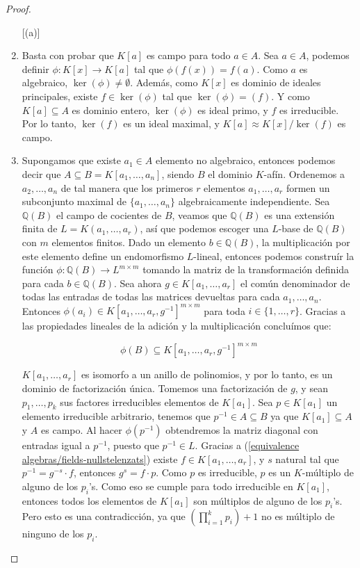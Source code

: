 \begin{proof}
\begin{enumerate} [(a)]
\item Basta con probar que $K[a]$ es campo para todo $a \in A$. Sea $a \in A$, podemos definir $\phi:K[x] \rightarrow K[a]$ tal que $\phi(f(x)) = f(a)$. Como $a$ es algebraico, $\ker(\phi) \neq \emptyset$. Además, como $K[x]$ es dominio de ideales principales, existe $f \in \ker(\phi)$ tal que $\ker(\phi) = (f)$. Y como $K[a] \subseteq A$ es dominio entero, $\ker(\phi)$ es ideal primo, y $f$ es irreducible. Por lo tanto, $\ker(f)$ es un ideal maximal, y $K[a] \approx K[x]/\ker(f)$ es campo.
\item Supongamos que existe $a_1 \in A$ elemento no algebraico, entonces podemos decir que $A \subseteq B =K[a_1, \dots, a_n]$, siendo $B$ el dominio $K$-afín. Ordenemos a  $a_2,\dots, a_n$ de tal manera que los primeros $r$ elementos $a_1,\dots,a_r$ formen un subconjunto maximal de $\{a_1,\dots,a_n\}$ algebraicamente independiente. Sea $\mathbb{Q}(B)$ el campo de cocientes de $B$, veamos que $\mathbb{Q}(B)$ es una extensión finita de $L = K(a_1, \dots, a_r)$, así que podemos escoger una $L$-base de $\mathbb{Q}(B)$ con $m$ elementos finitos. Dado un elemento $b \in \mathbb{Q}(B)$, la multiplicación por este elemento define un endomorfismo $L$-lineal, entonces podemos construír la función $\phi: \mathbb{Q}(B) \rightarrow L^{m\times m}$ tomando la matriz de la transformación definida para cada $b \in \mathbb{Q}(B)$. Sea ahora $g \in K[a_1,\dots,a_r]$ el común denominador de todas las entradas de todas las matrices devueltas para cada $a_1,\dots,a_n$. Entonces $\phi(a_i) \in K[a_1,\dots,a_r,g^{-1}]^{m\times m}$ para toda $i \in \{1, \dots, r\}$. Gracias a las propiedades lineales de la adición y la multiplicación concluímos que:

\begin{equation}\label{equivalence algebras/fields-nullstelenzats}
\phi(B) \subseteq K[a_1,\dots,a_r,g^{-1}]^{m\times m}
\end{equation} 

$K[a_1,\dots,a_r]$ es isomorfo a un anillo de polinomios, y por lo tanto, es un dominio de factorización única. Tomemos una factorización de $g$, y sean $p_1,\dots,p_k$ sus factores irreducibles elementos de $K[a_1]$. Sea $p \in K[a_1]$ un elemento irreducible arbitrario, tenemos que $p^{-1} \in A \subseteq B$ ya que $K[a_1] \subseteq A$ y $A$ es campo. Al hacer $\phi(p^{-1})$ obtendremos la matriz diagonal con entradas igual a $p^{-1}$, puesto que $p^{-1} \in L$. Gracias a (\ref{equivalence algebras/fields-nullstelenzats}) existe $f \in K[a_1,\dots, a_r]$, y $s$ natural tal que $p^{-1} = g^{-s}\cdot f$, entonces $g^s = f\cdot p$. Como $p$ es irreducible, $p$ es un $K$-múltiplo de alguno de los $p_i$'s. Como eso se cumple para todo irreducible en $K[a_1]$, entonces todos los elementos de $K[a_1]$ son múltiplos de alguno de los $p_i$'s. Pero esto es una contradicción, ya que $(\prod_{i=1}^k p_i) + 1$ no es múltiplo de ninguno de los $p_i$.
\end{enumerate}
\end{proof}

